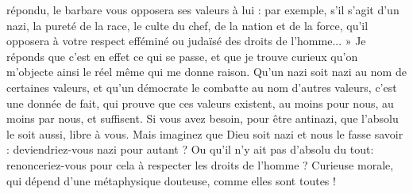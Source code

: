 répondu, le barbare vous opposera ses valeurs à lui : par exemple, s’il s’agit d’un
nazi, la pureté de la race, le culte du chef, de la nation et de la force, qu’il opposera
à votre respect efféminé ou judaïsé des droits de l’homme... » Je réponds
que c’est en effet ce qui se passe, et que je trouve curieux qu’on m’objecte ainsi
le réel même qui me donne raison. Qu'un nazi soit nazi au nom de certaines
valeurs, et qu’un démocrate le combatte au nom d’autres valeurs, c’est une
donnée de fait, qui prouve que ces valeurs existent, au moins pour nous, au
moins par nous, et suffisent. Si vous avez besoin, pour être antinazi, que
l’absolu le soit aussi, libre à vous. Mais imaginez que Dieu soit nazi et nous le
fasse savoir : deviendriez-vous nazi pour autant ? Ou qu’il n’y ait pas d’absolu
du tout: renonceriez-vous pour cela à respecter les droits de l’homme ?
Curieuse morale, qui dépend d’une métaphysique douteuse, comme elles sont
toutes !

